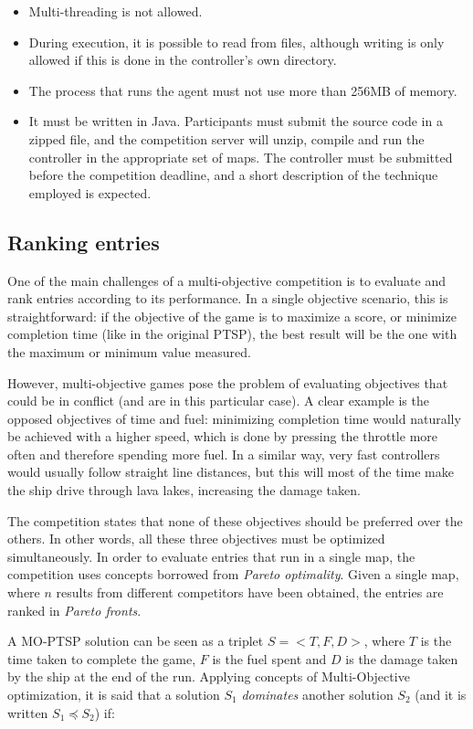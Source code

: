\documentclass[conference]{IEEEtran}
\begin{document}
\begin{itemize}
\item Multi-threading is not allowed.
\item During execution, it is possible to read from files, although writing is only allowed if this is done in the controller's own directory.
\item The process that runs the agent must not use more than 256MB of memory.
\item It must be written in Java. Participants must submit the source code in a zipped file, and the competition server will unzip, compile and run the controller in the appropriate set of maps. The controller must be submitted before the competition deadline, and a short description of the technique employed is expected.
\end{itemize}


\subsection{Ranking entries}

One of the main challenges of a multi-objective competition is to evaluate and rank entries according to its performance. In a single objective scenario, this is straightforward: if the objective of the game is to maximize a score, or minimize completion time (like in the original PTSP), the best result will be the one with the maximum or minimum value measured.

However, multi-objective games pose the problem of evaluating objectives that could be in conflict (and are in this particular case). A clear example is the opposed objectives of time and fuel: minimizing completion time would naturally be achieved with a higher speed, which is done by pressing the throttle more often and therefore spending more fuel. In a similar way, very fast controllers  would usually follow straight line distances, but this will most of the time make the ship drive through lava lakes, increasing the damage taken.

The competition states that none of these objectives should be preferred over the others. In other words, all these three objectives must be optimized simultaneously. In order to evaluate entries that run in a single map, the competition uses concepts borrowed from \textit{Pareto optimality}. Given a single map, where $n$ results from different competitors have been obtained, the entries are ranked in \textit{Pareto fronts}.

A MO-PTSP solution can be seen as a triplet $S = <T, F, D>$, where $T$ is the time taken to complete the game, $F$ is the fuel spent and $D$ is the damage taken by the ship at the end of the run. Applying concepts of Multi-Objective optimization, it is said that a solution $S_1$ \textit{dominates} another solution $S_2$ (and it is written $S_1 \preceq S_2$) if:
\end{document}
